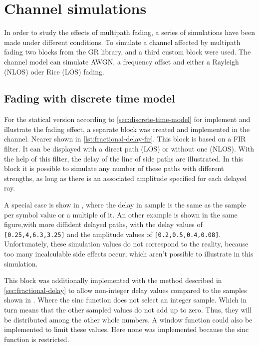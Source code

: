 \section{Channel simulations}

In order to study the effects of multipath fading, a series of simulations have been made under different conditions. To simulate a channel affected by multipath fading two blocks from the GR library, and a third custom block were used. The channel model can simulate AWGN, a frequency offset and either a Rayleigh (NLOS) oder Rice (LOS) fading.

\subsection{Fading with discrete time model} \label{sec:discrete-time-model-fir}

For the statical version according to \ref{sec:discrete-time-model} for implement and illustrate the fading effect, a separate block was created and implemented in the channel. Nearer shown in \ref{lst:fractional-delay-fir}. This block is based on a FIR filter. It can be displayed with a direct path (LOS) or without one (NLOS).
With the help of this filter, the delay of the line of side paths are illustrated. In this block it is possible to simulate any number of these paths with different strengths, as long as there is an associated amplitude specified for each delayed ray. 

A special case is show in , where the delay in sample is the same as the sample per symbol value or a multiple of it. An other example is shown in the same figure,with more diffident delayed paths, with the delay values of \texttt{[0.25,4,6.3,3.25]} and the amplitude values of \texttt{[0.2,0.5,0.4,0.08]}.
Unfortunately, these simulation values do not correspond to the reality, because too many incalculable side effects occur, which aren't possible to illustrate in this simulation.

This block was additionally implemented with the method described in \ref{sec:fractional-delay} to allow non-integer delay values compared to the samples shown in . Where the sinc function does not select an integer sample. Which in turn means that the other sampled values do not add up to zero.
Thus, they will be distributed among the other whole numbers. A window function could also be implemented to limit these values. Here none was implemented because the sinc function is restricted.

